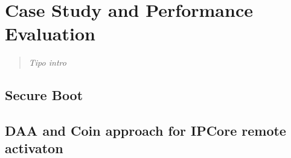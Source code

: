 \documentclass[../tesi.tex]{subfiles}
\begin{document}
\chapter{Case Study and Performance Evaluation}
\begin{quotation}
\emph{Tipo intro}
\end{quotation}

\section{Secure Boot}


\section{DAA and Coin approach for IPCore remote activaton}
\end{document}
